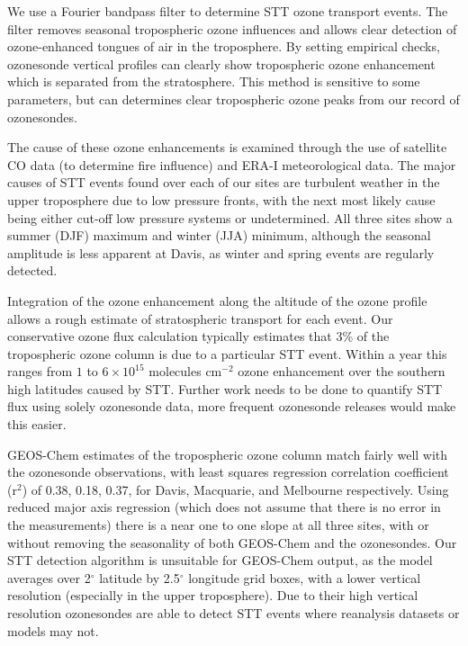 \documentclass{article}
\begin{document}
  We use a Fourier bandpass filter to determine STT ozone transport events.
  The filter removes seasonal tropospheric ozone influences and allows clear detection of ozone-enhanced tongues of air in the troposphere.
  By setting empirical checks, ozonesonde vertical profiles can clearly show tropospheric ozone enhancement which is separated from the stratosphere.
  This method is sensitive to some parameters, but can determines clear tropospheric ozone peaks from our record of ozonesondes.
  
  The cause of these ozone enhancements is examined through the use of satellite CO data (to determine fire influence) and ERA-I meteorological data.
  The major causes of STT events found over each of our sites are turbulent weather in the upper troposphere due to low pressure fronts, with the next most likely cause being either cut-off low pressure systems or undetermined.
  All three sites show a summer (DJF) maximum and winter (JJA) minimum, although the seasonal amplitude is less apparent at Davis, as winter and spring events are regularly detected.
  
  Integration of the ozone enhancement along the altitude of the ozone profile allows a rough estimate of stratospheric transport for each event.
  Our conservative ozone flux calculation typically estimates that 3\% of the tropospheric ozone column is due to a particular STT event.
  Within a year this ranges from $1$ to $6 \times 10^{15}$ molecules cm$^{-2}$ ozone enhancement over the southern high latitudes caused by STT.
  Further work needs to be done to quantify STT flux using solely ozonesonde data, more frequent ozonesonde releases would make this easier.
  
  GEOS-Chem estimates of the tropospheric ozone column match fairly well with the ozonesonde observations, with least squares regression correlation coefficient (r$^2$) of 0.38, 0.18, 0.37, for Davis, Macquarie, and Melbourne respectively.
  Using reduced major axis regression (which does not assume that there is no error in the measurements) there is a near one to one slope at all three sites, with or without removing the seasonality of both GEOS-Chem and the ozonesondes.
  Our STT detection algorithm is unsuitable for GEOS-Chem output, as the model averages over 2$^{\circ}$ latitude by 2.5$^{\circ}$ longitude grid boxes, with a lower vertical resolution (especially in the upper troposphere).
  Due to their high vertical resolution ozonesondes are able to detect STT events where reanalysis datasets or models may not.
  

\end{document}
